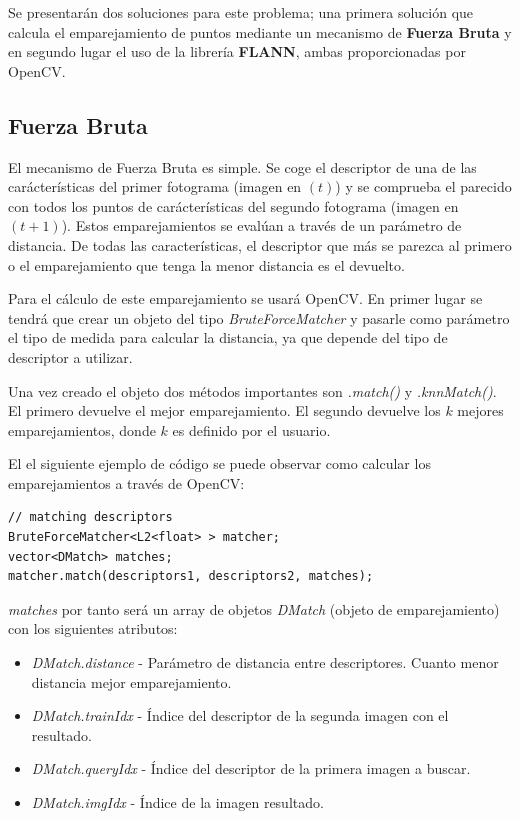 Se presentarán dos soluciones para este problema; una primera solución que calcula el emparejamiento de puntos mediante un mecanismo de \textbf{Fuerza Bruta} y en segundo lugar el uso de la librería \textbf{FLANN}, ambas proporcionadas por OpenCV.

\subsection{Fuerza Bruta}

El mecanismo de Fuerza Bruta es simple. Se coge el descriptor de una de las carácterísticas del primer fotograma (imagen en $(t)$) y se comprueba el parecido con todos los puntos de carácterísticas del segundo fotograma (imagen en $(t+1)$). Estos emparejamientos se evalúan a través de un parámetro de distancia. De todas las características, el descriptor que más se parezca al primero o el emparejamiento que tenga la menor distancia es el devuelto.

Para el cálculo de este emparejamiento se usará OpenCV. En primer lugar se tendrá que crear un objeto del tipo \textit{BruteForceMatcher} y pasarle como parámetro el tipo de medida para calcular la distancia, ya que depende del tipo de descriptor a utilizar.

Una vez creado el objeto dos métodos importantes son \textit{.match()} y \textit{.knnMatch()}. El primero devuelve el mejor emparejamiento. El segundo devuelve los $k$ mejores emparejamientos, donde $k$ es definido por el usuario.


El el siguiente ejemplo de código se puede observar como calcular los emparejamientos a través de OpenCV:

\begin{lstlisting}[style=CStyle]
// matching descriptors
BruteForceMatcher<L2<float> > matcher;
vector<DMatch> matches;
matcher.match(descriptors1, descriptors2, matches);
\end{lstlisting}

\textit{matches} por tanto será un array de objetos \textit{DMatch} (objeto de emparejamiento) con los siguientes atributos:

\begin{itemize}
\item \textit{DMatch.distance} - Parámetro de distancia entre descriptores. Cuanto menor distancia mejor emparejamiento.

\item \textit{DMatch.trainIdx} - Índice del descriptor de la segunda imagen con el resultado.

\item \textit{DMatch.queryIdx} - Índice del descriptor de la primera imagen a buscar.

\item \textit{DMatch.imgIdx} - Índice de la imagen resultado.
\end{itemize}

